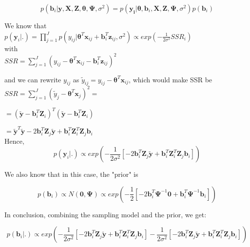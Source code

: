 \documentclass[a4paper]{article}
\begin{document}
\begin{equation}
	p(\bm{b}_{i}|\bm{y}, \bm{X}, \bm{Z}, \bm{\theta}, \bm{\Psi}, \sigma^2) = 	p(\bm{y_{i}}|\bm{\theta}, \bm{b}_{i}, \bm{X}, \bm{Z}, \bm{\Psi}, \sigma^2) p(\bm{b}_{i})
\end{equation}

We know that \\

$p(\bm{y}_{i}|.) = \prod_{j=1}^{J}p(y_{ij}|\bm{\theta}^{T}\bm{x}_{ij} + \bm{b}_{i}^{T}\bm{z}_{ij}, \sigma^2) \propto exp(-\frac{1}{2\sigma^2}SSR_{i})$\\

with\\

$SSR = \sum_{j = 1}^{J}( y_{ij}-\bm{\theta}^{T}\bm{x}_{ij} - \bm{b}_{i}^{T}\bm{z}_{ij})^2$

and we can rewrite $y_{ij}$ as $\tilde{y}_{ij} = y_{ij} - \bm{\theta}^{T}\bm{x}_{ij}$, which would make SSR be\\

$SSR = \sum_{j = 1}^{J}( \tilde{y}_{j}-\bm{\theta}^{T}\bm{x}_{j})^2=$

$= ( \tilde{\bm{y}} - \bm{b}_{i}^{T}\bm{Z}_{i})^{T}( \tilde{\bm{y}} - \bm{b}_{i}^{T}\bm{Z}_{i})$

$ = \tilde{\bm{y}}^{T}\tilde{\bm{y}} - 2\bm{b}_{i}^{T}\bm{Z}_{j}\tilde{\bm{y}} + \bm{b}_{i}^{T}\bm{Z}^{T}_{i} \bm{Z}_{j}\bm{b}_{i}$\\

Hence,
\begin{equation}
	p(\bm{y}_{i}|.) \propto exp(-\frac{1}{2\sigma^2}[- 2\bm{b}_{i}^{T}\bm{Z}_{j}\tilde{\bm{y}} + \bm{b}_{i}^{T}\bm{Z}^{T}_{i} \bm{Z}_{j}\bm{b}_{i}])
\end{equation}

We also know that in this case, the "prior" is

\begin{equation}
p(\bm{b}_{i}) \propto N(\bm{0}, \bm{\Psi}) \propto exp(-\frac{1}{2}[-2\bm{b}_{i}^{T}\bm{\Psi}^{-1}\bm{0} + \bm{b}_{i}^{T}\bm{\Psi}^{-1}\bm{b}_{i}])
\end{equation}

In conclusion, combining the sampling model and the prior, we get:

\begin{equation}
	p(\bm{b}_{i}|.) \propto 	
	exp(
	-\frac{1}{2\sigma^2}[- 2\bm{b}_{i}^{T}\bm{Z}_{j}\tilde{\bm{y}} + \bm{b}_{i}^{T}\bm{Z}^{T}_{i} \bm{Z}_{j}\bm{b}_{i}]
	-\frac{1}{2\sigma^2}[- 2\bm{b}_{i}^{T}\bm{Z}_{j}\tilde{\bm{y}} + \bm{b}_{i}^{T}\bm{Z}^{T}_{i} \bm{Z}_{j}\bm{b}_{i}]) 
\end{equation}
\end{document}

